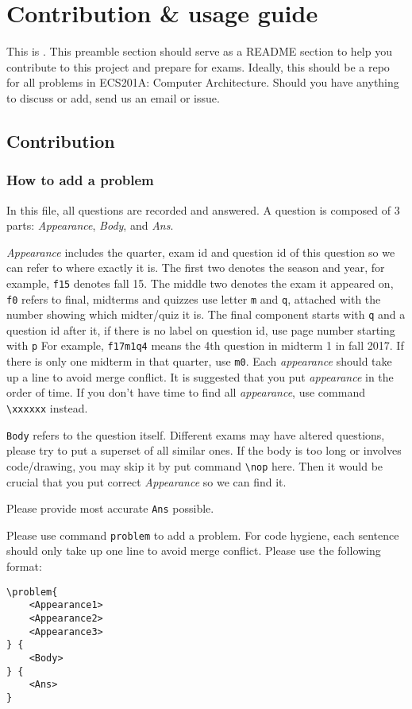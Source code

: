 \section*{Contribution \& usage guide}
This is \name. 
This preamble section should serve as a README section to help you contribute to this project and prepare for exams.
Ideally, this should be a repo for all problems in ECS201A: Computer Architecture.
Should you have anything to discuss or add, send us an email or issue.

\subsection*{Contribution}

\subsubsection*{How to add a problem}
In this file, all questions are recorded and answered.
A question is composed of 3 parts: \textit{Appearance}, \textit{Body}, and \textit{Ans}.

\textit{Appearance} includes the quarter, exam id and question id of this question so we can refer to where exactly it is.
The first two denotes the season and year, for example, \texttt{f15} denotes fall 15.
The middle two denotes the exam it appeared on, \texttt{f0} refers to final, midterms and quizzes use letter \texttt{m} and \texttt{q}, attached with the number showing which midter/quiz it is.
The final component starts with \texttt{q} and a question id after it, if there is no label on question id, use page number starting with \texttt{p}
For example, \texttt{f17m1q4} means the 4th question in midterm 1 in fall 2017. 
If there is only one midterm in that quarter, use \texttt{m0}.
Each \textit{appearance} should take up a line to avoid merge conflict. 
It is suggested that you put \textit{appearance} in the order of time.
If you don't have time to find all \textit{appearance}, use command \lstinline{\xxxxxx} instead.

\texttt{Body} refers to the question itself. 
Different exams may have altered questions, please try to put a superset of all similar ones.
If the body is too long or involves code/drawing, you may skip it by put command \lstinline{\nop} here.
Then it would be crucial that you put correct \textit{Appearance} so we can find it.

Please provide most accurate \texttt{Ans} possible.

Please use command \texttt{problem} to add a problem.
For code hygiene, each sentence should only take up one line to avoid merge conflict.
Please use the following format:
\begin{lstlisting}
\problem{
    <Appearance1>
    <Appearance2>
    <Appearance3>
} {
    <Body>
} {
    <Ans>
}
\end{lstlisting}

